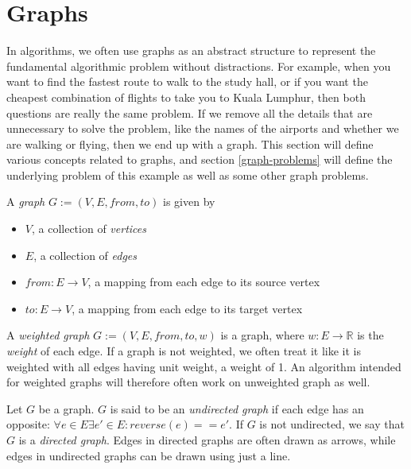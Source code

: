 \section{Graphs}
\label{graphs}
In algorithms, we often use graphs as an abstract structure to represent the fundamental algorithmic problem without distractions. For example, when you want to find the fastest route to walk to the study hall, or if you want the cheapest combination of flights to take you to Kuala Lumphur, then both questions are really the same problem. If we remove all the details that are unnecessary to solve the problem, like the names of the airports and whether we are walking or flying, then we end up with a graph. This section will define various concepts related to graphs, and section \ref{graph-problems} will define the underlying problem of this example as well as some other graph problems.

\begin{definition}[Graph]
    A \emph{graph} $G := (V, E, from, to)$ is given by
\begin{itemize}
    \item $V$, a collection of \emph{vertices}
    \item $E$, a collection of \emph{edges}
    \item $from : E \rightarrow V$, a mapping from each edge to its source vertex
    \item $to : E \rightarrow V$, a mapping from each edge to its target vertex 
\end{itemize}
\end{definition}

\begin{definition}
    A \emph{weighted graph} $G := (V, E, from, to, w)$ is a graph, where $w : E \rightarrow \mathbb{R}$ is the \emph{weight} of each edge. If a graph is not weighted, we often treat it like it is weighted with all edges having unit weight, a weight of 1. An algorithm intended for weighted graphs will therefore often work on unweighted graph as well.
\end{definition}

\begin{definition}
    Let $G$ be a graph. $G$ is said to be an \emph{undirected graph} if each edge has an opposite: $\forall e \in E \exists e' \in E : reverse(e) == e'$.
    If $G$ is not undirected, we say that $G$ is a \emph{directed graph}.
    Edges in directed graphs are often drawn as arrows, while edges in undirected graphs can be drawn using just a line.
\end{definition}

